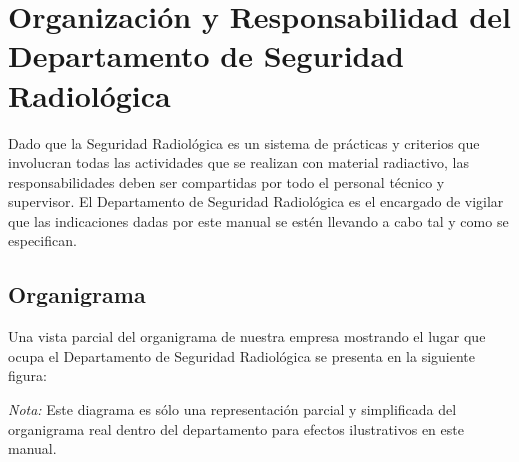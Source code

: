 \section*{Organización y Responsabilidad del Departamento de Seguridad Radiológica}

Dado que la Seguridad Radiológica es un sistema de prácticas y criterios que involucran todas las actividades que se realizan con material radiactivo, las responsabilidades deben ser compartidas por todo el personal técnico y supervisor. El Departamento de Seguridad Radiológica es el encargado de vigilar que las indicaciones dadas por este manual se estén llevando a cabo tal y como se especifican.

\subsection*{Organigrama}

Una vista parcial del organigrama de nuestra empresa mostrando el lugar que ocupa el Departamento de Seguridad Radiológica se presenta en la siguiente figura:

\begin{center}
\end{center}

\textit{Nota:} Este diagrama es sólo una representación parcial y simplificada del organigrama real dentro del departamento para efectos ilustrativos en este manual.
